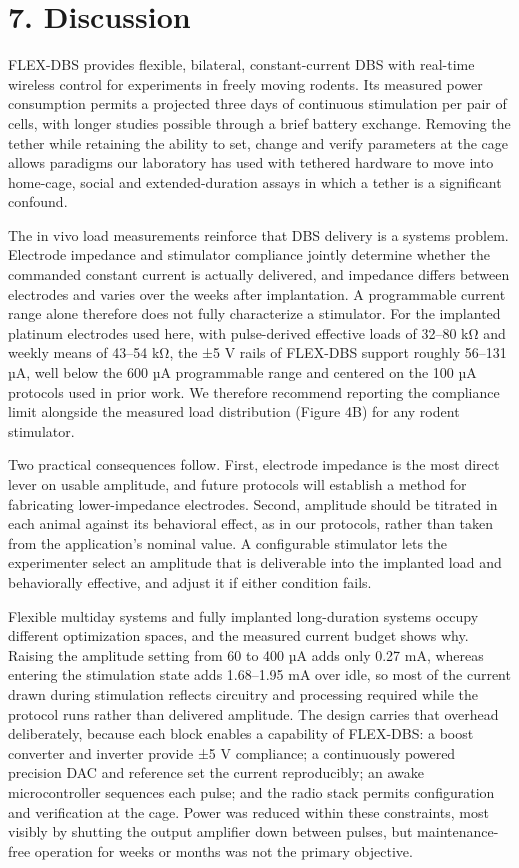 \section{7. Discussion}\label{discussion}

FLEX-DBS provides flexible, bilateral, constant-current DBS with real-time wireless control for experiments in freely moving rodents. Its measured power consumption permits a projected three days of continuous stimulation per pair of cells, with longer studies possible through a brief battery exchange. Removing the tether while retaining the ability to set, change and verify parameters at the cage allows paradigms our laboratory has used with tethered hardware \citep{creed2011,creed2012egr,creed2013,aleksandrova2013} to move into home-cage, social and extended-duration assays in which a tether is a significant confound.

The in vivo load measurements reinforce that DBS delivery is a systems problem. Electrode impedance and stimulator compliance jointly determine whether the commanded constant current is actually delivered, and impedance differs between electrodes and varies over the weeks after implantation. A programmable current range alone therefore does not fully characterize a stimulator. For the implanted platinum electrodes used here, with pulse-derived effective loads of 32--80 kΩ and weekly means of 43--54 kΩ, the ±5 V rails of FLEX-DBS support roughly 56--131 µA, well below the 600 µA programmable range and centered on the 100 µA protocols used in prior work. We therefore recommend reporting the compliance limit alongside the measured load distribution (Figure 4B) for any rodent stimulator.

Two practical consequences follow. First, electrode impedance is the most direct lever on usable amplitude, and future protocols will establish a method for fabricating lower-impedance electrodes. Second, amplitude should be titrated in each animal against its behavioral effect, as in our protocols, rather than taken from the application's nominal value. A configurable stimulator lets the experimenter select an amplitude that is deliverable into the implanted load and behaviorally effective, and adjust it if either condition fails.

Flexible multiday systems and fully implanted long-duration systems occupy different optimization spaces, and the measured current budget shows why. Raising the amplitude setting from 60 to 400 µA adds only 0.27 mA, whereas entering the stimulation state adds 1.68--1.95 mA over idle, so most of the current drawn during stimulation reflects circuitry and processing required while the protocol runs rather than delivered amplitude. The design carries that overhead deliberately, because each block enables a capability of FLEX-DBS: a boost converter and inverter provide ±5 V compliance; a continuously powered precision DAC and reference set the current reproducibly; an awake microcontroller sequences each pulse; and the radio stack permits configuration and verification at the cage. Power was reduced within these constraints, most visibly by shutting the output amplifier down between pulses, but maintenance-free operation for weeks or months was not the primary objective.

